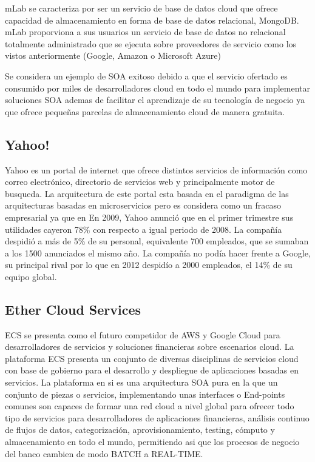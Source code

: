 \documentclass[a4paper,11pt]{book}
\begin{document}
mLab\cite{mlab} se caracteriza por ser un servicio de base de datos cloud que ofrece capacidad de almacenamiento en forma de base de datos relacional, MongoDB. mLab proporviona a sus usuarios un servicio de base de datos no relacional totalmente administrado que se ejecuta sobre proveedores de servicio como los vistos anteriormente (Google, Amazon o Microsoft Azure)

Se considera un ejemplo de SOA exitoso debido a que el servicio ofertado es consumido por miles de desarrolladores cloud en todo el mundo para implementar soluciones SOA ademas de facilitar el aprendizaje de su tecnología de negocio ya que ofrece pequeñas parcelas de almacenamiento cloud de manera gratuita. 

\subsection{Yahoo!}

Yahoo\cite{yahoo} es un portal de internet que ofrece distintos servicios de información como correo electrónico, directorio de servicios web y principalmente motor de busqueda. La arquitectura de este portal esta basada en el paradigma de las arquitecturas basadas en microservicios pero es considera como un fracaso empresarial ya que en En 2009, Yahoo anunció que en el primer trimestre sus utilidades cayeron 78\% con respecto a igual periodo de 2008. La compañía despidió a más de 5\% de su personal, equivalente 700 empleados, que se sumaban a 
los 1500 anunciados el mismo año. La compañía no podía hacer frente a Google, su principal rival por lo que en 2012 despidío a 2000 empleados, el 14\% de su equipo global. 

\subsection{Ether Cloud Services}

ECS\cite{ecs} se presenta como el futuro competidor de AWS y Google Cloud para desarrolladores de servicios y soluciones financieras sobre escenarios cloud. La plataforma ECS presenta un conjunto de diversas disciplinas de servicios cloud con base de gobierno para el desarrollo y despliegue de aplicaciones basadas en servicios. La plataforma en si es una arquitectura SOA pura en la que un conjunto de piezas o servicios, implementando unas interfaces o End-points comunes son capaces de formar una red cloud a nivel global para ofrecer todo tipo de servicios para desarrolladores de aplicaciones financieras, análisis continuo de flujos de datos, categorización, aprovisionamiento, testing, cómputo y almacenamiento en todo el mundo, permitiendo asi que los procesos de negocio del banco cambien de modo BATCH a REAL-TIME.  
\end{document}
